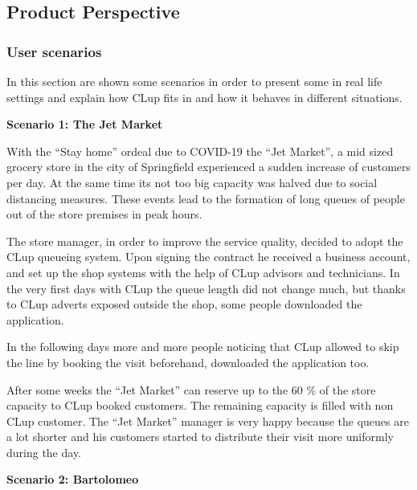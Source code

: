 \subsection{Product Perspective}
\subsubsection{User scenarios}
In this section are shown some scenarios in order to present some in real life settings and explain how CLup fits in and how it behaves in different situations.


\medskip

\textbf{Scenario 1: The Jet Market}

With the ``Stay home'' ordeal due to COVID-19 the ``Jet Market'', a mid sized grocery store in the city of Springfield experienced a sudden increase of customers per day. At the same time its not too big capacity was halved due to social distancing measures. These events lead to the formation of long queues of people out of the store premises in peak hours.

\smallskip

The store manager, in order to improve the service quality, decided to adopt the CLup queueing system. Upon signing the contract he received a business account, and set up the shop systems with the help of CLup advisors and technicians. In the very first days with CLup the queue length did not change much, but thanks to CLup adverts exposed outside the shop, some people downloaded the application.

\smallskip

In the following days more and more people noticing that CLup allowed to skip the line by booking the visit beforehand, downloaded the application too.

\smallskip

After some weeks the ``Jet Market'' can reserve up to the 60 \% of the store capacity to CLup booked customers. The remaining capacity is filled with non CLup customer. The ``Jet Market'' manager is very happy because the queues are a lot shorter and his customers started to distribute their visit more uniformly during the day.

\medskip

\textbf{Scenario 2: Bartolomeo}

